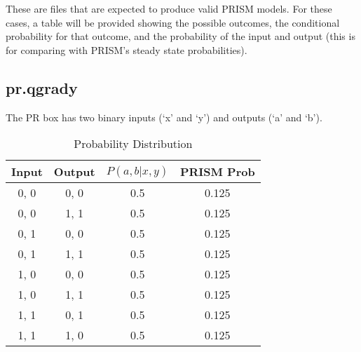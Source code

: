 \documentclass[report.tex]{subfiles}
\begin{document}
These are files that are expected to produce valid PRISM models. For these
cases, a table will be provided showing the possible outcomes, the conditional
probability for that outcome, and the probability of the input and output (this
is for comparing with PRISM's steady state probabilities).

\subsection{pr.qgrady} %
\label{sub:pr_qgrady}
The PR box has two binary inputs (`x' and `y') and outputs (`a' and `b').
\begin{table}[H]
  \centering
  \begin{tabular}{c | c | c | c}
    Input & Output & \(P(a, b | x, y)\) & PRISM Prob \\
    \hline
    0, 0 & 0, 0 & 0.5 & 0.125 \\
    0, 0 & 1, 1 & 0.5 & 0.125 \\
    0, 1 & 0, 0 & 0.5 & 0.125 \\
    0, 1 & 1, 1 & 0.5 & 0.125 \\
    1, 0 & 0, 0 & 0.5 & 0.125 \\
    1, 0 & 1, 1 & 0.5 & 0.125 \\
    1, 1 & 0, 1 & 0.5 & 0.125 \\
    1, 1 & 1, 0 & 0.5 & 0.125 \\
  \end{tabular}
  \caption{Probability Distribution}
  \label{tab:pr_qgrady}
\end{table}
\newpage
\end{document}
